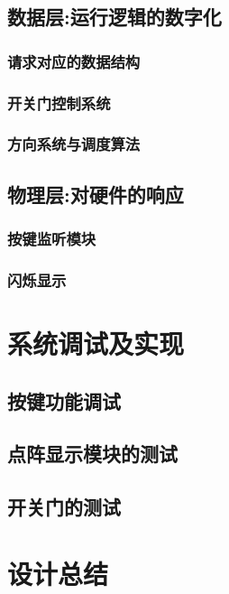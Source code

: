 \documentclass[pdfCover]{myreport} %
\begin{document}
  \subsection{数据层:运行逻辑的数字化}
    \subsubsection{请求对应的数据结构}
      
    \subsubsection{开关门控制系统}
      
    \subsubsection{方向系统与调度算法}
      


  \subsection{物理层:对硬件的响应}
    
    \subsubsection{按键监听模块}
      

    \subsubsection{闪烁显示}
      



\section{系统调试及实现}
  \subsection{按键功能调试}
    
  \subsection{点阵显示模块的测试}
    
  \subsection{开关门的测试}
    


\newpage
\section{设计总结}
  



\nocite{*}
\end{document}

